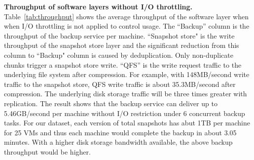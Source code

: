 {\bf Throughput of software layers without I/O throttling.}
Table~\ref{tab:throughput} shows the  average throughput of the software layer
when when I/O throttling is not applied to control usage. The
``Backup'' column is the throughput  of the backup service  per machine.
``Snapshot store" is the  write throughput of the snapshot store layer and the significant reduction from this
column to  ``Backup" column is caused by deduplication.
Only non-duplicate chunks trigger a snapshot store write.
``QFS'' is the write request traffic to the underlying file system after compression.
For example, with 148MB/second write traffic to the snapshot store, QFS write traffic is about 35.3MB/second
after compression.  The underlying disk storage traffic will be three times greater with replication.
The result shows that the backup service can deliver up to 5.46GB/second 
per machine without I/O restriction
under 6 concurrent backup tasks. 
For our dataset, each version of total snapshots  has abut  1TB per machine for 25 VMs and  thus  each machine
would complete the backup in about 3.05 minutes.
With a higher disk storage bandwidth available, the above backup
throughput would be higher. 
 



